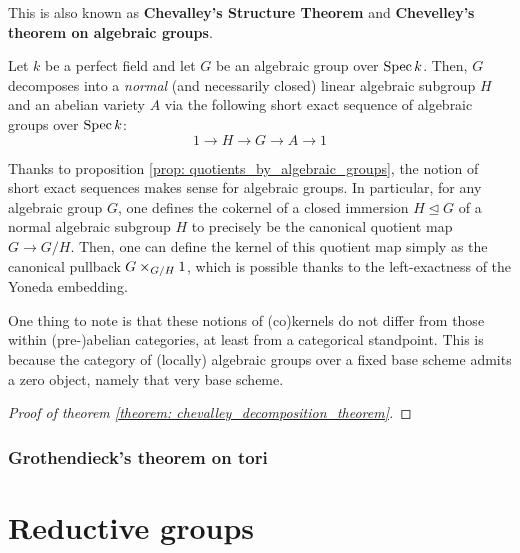                 \begin{theorem} \label{theorem: chevalley_decomposition_theorem}
                    This is also known as \textbf{Chevalley's Structure Theorem} and \textbf{Chevelley's theorem on algebraic groups}.
                
                    Let $k$ be a perfect field and let $G$ be an algebraic group over $\operatorname{Spec} k$. Then, $G$ decomposes into a \textit{normal} (and necessarily closed) linear algebraic subgroup $H$ and an abelian variety $A$ via the following short exact sequence of algebraic groups over $\operatorname{Spec} k$:
                        $$1 \to H \to G \to A \to 1$$
                \end{theorem}
                \begin{remark} \label{remark: short_exact_sequences_algebraic_groups}
                    Thanks to proposition \ref{prop: quotients_by_algebraic_groups}, the notion of short exact sequences makes sense for algebraic groups. In particular, for any algebraic group $G$, one defines the cokernel of a closed immersion $H \trianglelefteq G$ of a normal algebraic subgroup $H$ to precisely be the canonical quotient map $G \to G/H$. Then, one can define the kernel of this quotient map simply as the canonical pullback $G \x_{G/H} 1$, which is possible thanks to the left-exactness of the Yoneda embedding. 
                    
                    One thing to note is that these notions of (co)kernels do not differ from those within (pre-)abelian categories, at least from a categorical standpoint. This is because the category of (locally) algebraic groups over a fixed base scheme admits a zero object, namely that very base scheme. 
                \end{remark}
                    \begin{proof}[Proof of theorem \ref{theorem: chevalley_decomposition_theorem}]
                        
                    \end{proof}
            
            \subsubsection{Grothendieck's theorem on tori}
    
    \section{Reductive groups}
